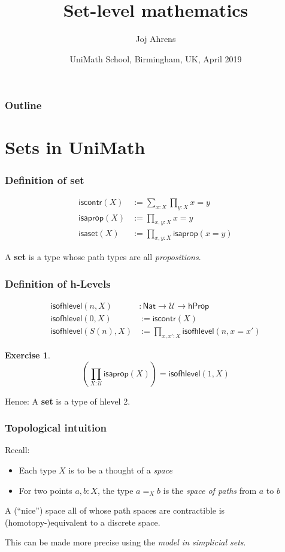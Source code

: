 \documentclass{beamer}
\title{Set-level mathematics}
\author{Joj Ahrens}
\date{UniMath School, Birmingham, UK, April 2019}
\newcommand{\fat}[1]{\textbf{#1}}
\newcommand{\constfont}[1]{\ensuremath{\mathsf{#1}}}
\newcommand{\U}{\mathcal{U}}
\newcommand{\Nat}{\constfont{Nat}}
\newcommand{\hProp}{\constfont{hProp}}
\newcommand{\isofhlevel}{\constfont{isofhlevel}}
\newcommand{\iscontr}{\constfont{iscontr}}
\newcommand{\isaprop}{\constfont{isaprop}}
\newcommand{\isaset}{\constfont{isaset}}
\newcommand{\outlinetitle}{Outline}
\theoremstyle{definition}
\newtheorem{exercise}{Exercise}
\begin{document}
\begin{frame}
 \titlepage
\end{frame}

\begin{frame}
 \frametitle{\outlinetitle}
 \tableofcontents
\end{frame}

\section{Sets in UniMath}

\begin{frame}
 \frametitle{Definition of set}
   \begin{align*}
    \iscontr(X) &:= \sum_{x:X}\prod_{y:X}x=y
    \\ \isaprop(X) &:= \prod_{x,y: X}x=y
    \\ \isaset(X) &:= \prod_{x,y: X}\isaprop(x=y)
   \end{align*}

   \begin{block}{}
      A \fat{set} is a type whose path types are all \emph{propositions}.
   \end{block}
\end{frame}

\begin{frame}
 \frametitle{Definition of h-Levels}
   \begin{align*}
       \isofhlevel(n,X) &: \Nat \to \U \to \hProp
    \\ \isofhlevel(0,X) &:= \iscontr(X)
    \\ \isofhlevel(S(n),X) &:= \prod_{x,x': X}\isofhlevel(n,x=x')
   \end{align*}

   \pause
   \begin{exercise}
     \[\left(\prod_{X:\U}\isaprop(X)\right)=\isofhlevel(1,X)\]
   \end{exercise}

   \pause
   \begin{block}{Hence:}
      A \fat{set} is a type of hlevel 2.
   \end{block}
\end{frame}

\begin{frame}
  \frametitle{Topological intuition}
  Recall:
  \begin{itemize}
  \item Each type $X$ is to be a thought of a \emph{space}
  \item For two points $a,b:X$, the type $a=_Xb$ is the \emph{space of paths} from $a$ to $b$
  \end{itemize}

  \begin{fact}
    A (``nice'') space all of whose path spaces are contractible is (homotopy-)equivalent to a discrete space.
  \end{fact}

  \pause
  \begin{center}
  {\tiny This can be made more precise using the \emph{model in simplicial sets}.}
\end{center}
\end{frame}
\end{document}
